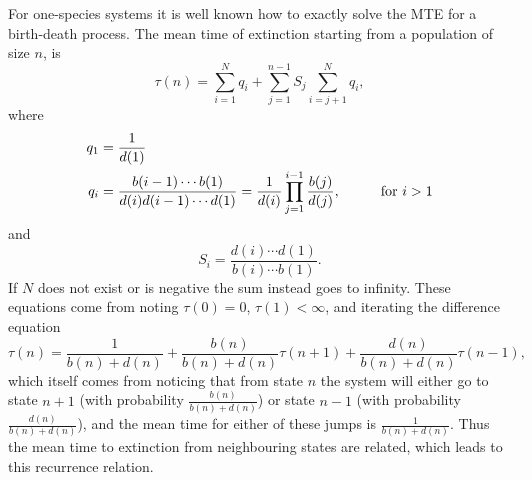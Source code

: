 For one-species systems it is well known how to exactly solve the MTE for a birth-death process. 
The mean time of extinction starting from a population of size $n$, is \cite{Nisbet1982,Palamara2012}
\begin{equation}
\tau(n) = \sum_{i=1}^{N}q_i + \sum_{j=1}^{n-1} S_j\sum_{i=j+1}^{N}q_i,
\label{analytic_mte}
\end{equation}
where
\begin{align}
q_1 &= \frac{1}{d(1)} \\
q_i &= \frac{b(i-1)\cdots b(1)}{d(i)d(i-1)\cdots d(1)} = \frac{1}{d(i)}\prod_{j=1}^{i-1}\frac{b(j)}{d(j)}, \hspace{1cm} \text{for }i > 1 \notag
\end{align}
and
\begin{equation}
S_i = \frac{d(i)\cdots d(1)}{b(i)\cdots b(1)}.  
\end{equation}
If $N$ does not exist or is negative the sum instead goes to infinity. 
These equations come from noting $\tau(0)=0$, $\tau(1)<\infty$, and iterating the difference equation \cite{Nisbet1982,Palamara2012}
\begin{equation}
\tau(n) = \frac{1}{b(n)+d(n)} 
+ \frac{b(n)}{b(n)+d(n)}\tau(n+1) 
+ \frac{d(n)}{b(n)+d(n)}\tau(n-1),
 \label{mte-recurrence}
\end{equation}
which itself comes from noticing that from state $n$ the system will either go to state $n+1$ (with probability $\frac{b(n)}{b(n)+d(n)}$) or state $n-1$ (with probability $\frac{d(n)}{b(n)+d(n)}$), and the mean time for either of these jumps is $\frac{1}{b(n)+d(n)}$. 
Thus the mean time to extinction from neighbouring states are related, which leads to this recurrence relation. 

